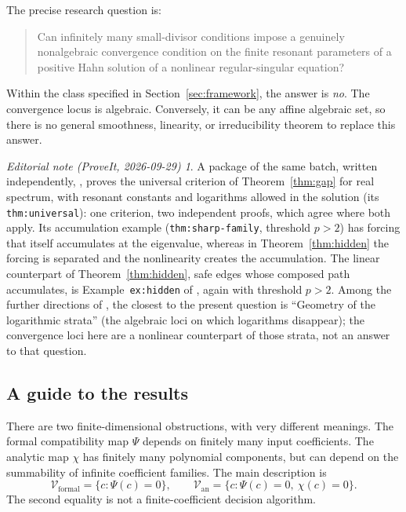 \documentclass[11pt,a4paper]{article}
\numberwithin{equation}{section}
\theoremstyle{definition}
\theoremstyle{remark}
\newtheorem*{ednote}{Editorial note (ProveIt, 2026-09-29)}
\newcommand{\cV}{\mathcal V}
\begin{document}
The precise research question is:
\begin{quote}
Can infinitely many small-divisor conditions impose a genuinely
nonalgebraic convergence condition on the finite resonant parameters of a
positive Hahn solution of a nonlinear regular-singular equation?
\end{quote}
Within the class specified in Section~\ref{sec:framework}, the answer is
\emph{no}. The convergence locus is algebraic. Conversely, it can be any
affine algebraic set, so there is no general smoothness, linearity, or
irreducibility theorem to replace this answer.
\begin{ednote}
A package of the same batch, written independently,
, proves the universal
criterion of Theorem~\ref{thm:gap} for real spectrum, with resonant
constants and logarithms allowed in the solution (its
\texttt{thm:universal}): one criterion, two independent proofs, which agree
where both apply. Its accumulation example (\texttt{thm:sharp-family},
threshold \(p>2\)) has forcing that itself accumulates at the eigenvalue,
whereas in Theorem~\ref{thm:hidden} the forcing is separated and the
nonlinearity creates the accumulation. The linear counterpart of
Theorem~\ref{thm:hidden}, safe edges whose composed path accumulates, is
Example~\texttt{ex:hidden} of
, again with threshold
\(p>2\). Among the further directions of \cite{repo-linear}, the closest to
the present question is ``Geometry of the logarithmic strata'' (the
algebraic loci on which logarithms disappear); the convergence loci here
are a nonlinear counterpart of those strata, not an answer to that
question.
\end{ednote}

\subsection{A guide to the results}
There are two finite-dimensional obstructions, with very different meanings.
The formal compatibility map $\Psi$ depends on finitely many input
coefficients. The analytic map $\chi$ has finitely many polynomial
components, but can depend on the summability of infinite coefficient
families. The main description is
\begin{equation}\label{eq:main-description}
 \cV_{\mathrm{formal}}=\{c:\Psi(c)=0\},\qquad
 \cV_{\mathrm{an}}=\{c:\Psi(c)=0,\ \chi(c)=0\}.
\end{equation}
The second equality is not a finite-coefficient decision algorithm.
\end{document}

